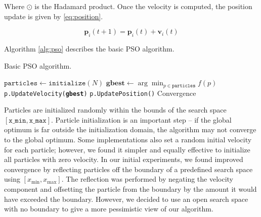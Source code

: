 Where $\odot$ is the Hadamard product.
Once the velocity is computed, the position update is given by
\eqref{eq:position}.

\begin{equation}\label{eq:position}
  \textbf{p}_i(t+1) = \textbf{p}_i(t) + \textbf{v}_i(t)
\end{equation}

% 
Algorithm \ref{alg:pso} describes the basic PSO algorithm.

\begin{algorithm}
  \caption{Basic PSO algorithm.}\label{alg:pso}
  \begin{algorithmic}[1]
    \State $\texttt{particles} \gets \texttt{initialize}(N)$
    \Repeat
    \State $\textbf{gbest} \gets \arg\min_{p\in\texttt{particles}}f(p)$
    \State \texttt{p.UpdateVelocity(\textbf{gbest})}
    \State \texttt{p.UpdatePosition()}
    \EndFor
    \Until Convergence
    \EndProcedure
  \end{algorithmic}
\end{algorithm}

Particles are initialized randomly within the bounds of the search space
$[\texttt{x\_min}, \texttt{x\_max}]$. Particle initialization is an important
step -- if the global optimum is far outside the initialization domain, the
algorithm may not converge to the global optimum.
Some implementations also set a random
initial velocity for each particle; however, we found it simpler and equally
effective to initialize all particles with zero velocity. In our initial
experiments, we found improved convergence by reflecting particles off the
boundary of a predefined search space using $[x_{\min}, x_{\max}]$. The
reflection was performed by negating the velocity component and offsetting the
particle from the boundary by the amount it would have exceeded the boundary.
However, we decided to use an open search space with no boundary to give a more
pessimistic view of our algorithm.

